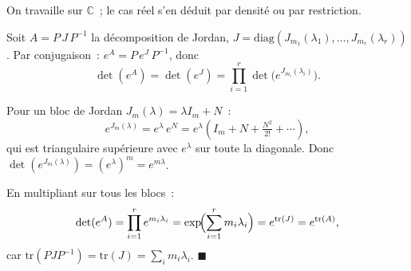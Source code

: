\begin{mdframed}[style=proofbar]
  On travaille sur $\mathbb{C}$~; le cas réel s'en déduit par densité ou par
  restriction.

  \medskip
  Soit $A = P\,J\,P^{-1}$ la décomposition de Jordan,
  $J = \mathrm{diag}(J_{m_1}(\lambda_1), \ldots, J_{m_r}(\lambda_r))$.
  Par conjugaison~: $e^A = P\,e^J\,P^{-1}$, donc
  \[
    \det(e^A) = \det(e^J)
    = \prod_{i=1}^r \det\!\bigl(e^{J_{m_i}(\lambda_i)}\bigr).
  \]

  Pour un bloc de Jordan $J_m(\lambda) = \lambda I_m + N$~:
  \[
    e^{J_m(\lambda)} = e^\lambda\,e^N = e^\lambda(I_m + N + \tfrac{N^2}{2!}+\cdots),
  \]
  qui est triangulaire supérieure avec $e^\lambda$ sur toute la diagonale.
  Donc $\det(e^{J_m(\lambda)}) = {(e^\lambda)}^m = e^{m\lambda}$.

  En multipliant sur tous les blocs~:
  \[
    \det(e^A) = \prod_{i=1}^r e^{m_i \lambda_i}
              = \exp\!\Bigl(\sum_{i=1}^r m_i \lambda_i\Bigr)
              = e^{\mathrm{tr}(J)}
              = e^{\mathrm{tr}(A)},
  \]
  car $\mathrm{tr}(PJP^{-1}) = \mathrm{tr}(J) = \sum_i m_i\lambda_i$. \hfill$\blacksquare$
\end{mdframed}

\decsep{}



